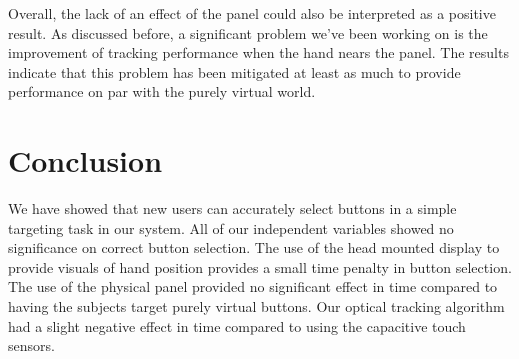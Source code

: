 Overall, the lack of an effect of the panel could also be interpreted as a positive result.
As discussed before, a significant problem we've been working on is the improvement of tracking performance when the hand nears the panel.
The results indicate that this problem has been mitigated at least as much to provide performance on par with the purely virtual world.

\section{Conclusion}


We have showed that new users can accurately select buttons in a simple targeting task in our system.
All of our independent variables showed no significance on correct button selection.
The use of the head mounted display to provide visuals of hand position provides a small time penalty in button selection.
The use of the physical panel provided no significant effect in time compared to having the subjects target purely virtual buttons.
Our optical tracking algorithm had a slight negative effect in time compared to using the capacitive touch sensors.
